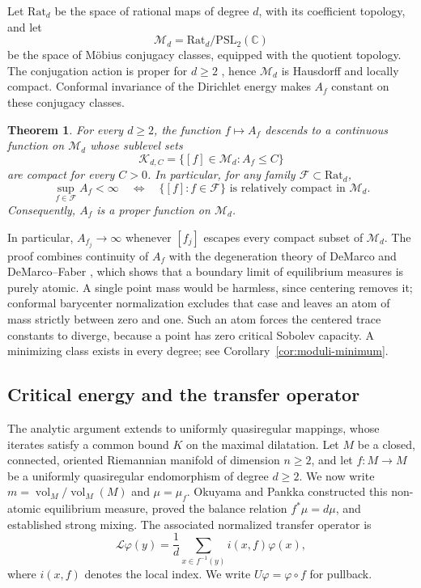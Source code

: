 \documentclass[11pt,reqno]{amsart}
\theoremstyle{plain}
\newtheorem{theorem}{Theorem}[section]
\theoremstyle{definition}
\theoremstyle{remark}
\newcommand{\C}{\mathbb C}
\newcommand{\Lop}{\mathcal L}
\DeclareMathOperator{\vol}{vol}
\numberwithin{equation}{section}
\begin{document}
Let $\mathrm{Rat}_d$ be the space of rational maps of degree $d$, with its coefficient topology, and let
\[
 \mathcal M_d=\mathrm{Rat}_d/\mathrm{PSL}_2(\C)
\]
be the space of M\"obius conjugacy classes, equipped with the quotient topology. The conjugation action is proper for $d\ge2$ \cite[Lemma 4.3]{BFN22}, hence $\mathcal M_d$ is Hausdorff and locally compact. Conformal invariance of the Dirichlet energy makes $A_f$ constant on these conjugacy classes.

\begin{theorem}\label{thm:moduli-properness}
For every $d\ge2$, the function $f\mapsto A_f$ descends to a continuous function on $\mathcal M_d$ whose sublevel sets
\begin{equation}\label{eq:moduli-sublevel}
 \mathcal K_{d,C}=\{[f]\in\mathcal M_d:A_f\le C\}
\end{equation}
are compact for every $C>0$. In particular, for any family $\mathcal F\subset\mathrm{Rat}_d$,
\begin{equation}\label{eq:moduli-uniformity}
 \sup_{f\in\mathcal F}A_f<\infty
 \quad\Longleftrightarrow\quad
 \{[f]:f\in\mathcal F\}\text{ is relatively compact in }\mathcal M_d.
\end{equation}
Consequently, $A_f$ is a proper function on $\mathcal M_d$.
\end{theorem}

In particular, $A_{f_j}\to\infty$ whenever $[f_j]$ escapes every compact subset of $\mathcal M_d$. The proof combines continuity of $A_f$ with the degeneration theory of DeMarco \cite{DeM05} and DeMarco--Faber \cite{DF14}, which shows that a boundary limit of equilibrium measures is purely atomic. A single point mass would be harmless, since centering removes it; conformal barycenter normalization \cite{DE86} excludes that case and leaves an atom of mass strictly between zero and one. Such an atom forces the centered trace constants to diverge, because a point has zero critical Sobolev capacity. A minimizing class exists in every degree; see Corollary~\ref{cor:moduli-minimum}.

\subsection{Critical energy and the transfer operator}

The analytic argument extends to uniformly quasiregular mappings, whose iterates satisfy a common bound $K$ on the maximal dilatation. Let $M$ be a closed, connected, oriented Riemannian manifold of dimension $n\ge2$, and let $f\colon M\to M$ be a uniformly quasiregular endomorphism of degree $d\ge2$. We now write $m=\vol_M/\vol_M(M)$ and $\mu=\mu_f$. Okuyama and Pankka \cite{OP14} constructed this non-atomic equilibrium measure, proved the balance relation $f^*\mu=d\mu$, and established strong mixing. The associated normalized transfer operator is
\begin{equation}\label{eq:intro-transfer}
 \Lop\varphi(y)=\frac1d\sum_{x\in f^{-1}(y)}i(x,f)\varphi(x),
\end{equation}
where $i(x,f)$ denotes the local index. We write $U\varphi=\varphi\circ f$ for pullback.
\end{document}
